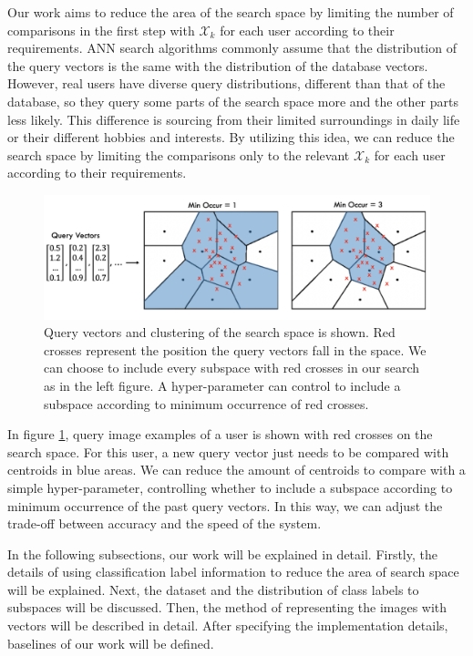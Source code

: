 Our work aims to reduce the area of the search space by limiting the number of comparisons in the first step with $\mathcal{X}_k$ for each user according to their requirements. 
ANN search algorithms commonly assume that the distribution of the query vectors is the same with the distribution of the database vectors. 
However, real users have diverse query distributions, different than that of the database, 
so they query some parts of the search space more and the other parts less likely. 
This difference is sourcing from their limited surroundings in daily life or their different hobbies and interests. 
By utilizing this idea, we can reduce the search space by limiting the comparisons only to the relevant $\mathcal{X}_k$ for each user according to their requirements.

\begin{figure}
    \centering
    \includegraphics[width=\textwidth]{thesis/images/improvement-fig.png}
    \caption{Query vectors and clustering of the search space is shown. Red crosses represent the position the query vectors fall in the space. We can choose to include every subspace with red crosses in our search as in the left figure. A hyper-parameter can control to include a subspace according to minimum occurrence of red crosses.}
    \label{fig:motivation}
\end{figure}

In figure \ref{fig:motivation}, query image examples of a user is shown with red crosses on the search space. 
For this user, a new query vector just needs to be compared with centroids in blue areas. 
We can reduce the amount of centroids to compare with a simple hyper-parameter, controlling whether to include a subspace according to minimum occurrence of the past query vectors. 
In this way, we can adjust the trade-off between accuracy and the speed of the system.

In the following subsections, our work will be explained in detail. 
Firstly, the details of using classification label information to reduce the area of search space will be explained. 
Next, the dataset and the distribution of class labels to subspaces will be discussed.
Then, the method of representing the images with vectors will be described in detail. 
After specifying the implementation details, baselines of our work will be defined.

